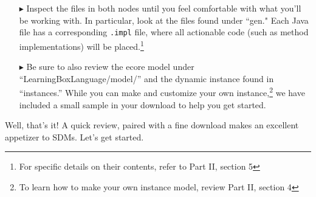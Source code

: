 \begin{itemize}

\item[$\blacktriangleright$] Inspect the files in both nodes until you feel comfortable with what you'll be working with. In particular, look at the files found
under ``gen." Each Java file has a corresponding \texttt{.impl} file, where all actionable code (such as method implementations) will be placed.\footnote{For
specific details on their contents, refer to Part II, section 5} 

\item[$\blacktriangleright$] Be sure to also review the ecore model under ``LearningBoxLanguage/model/'' and the dynamic instance found in ``instances.'' While
you can make and customize your own instance,\footnote{To learn how to make your own instance model, review Part II, section 4} we have included a small sample
in your download to help you get started.

\end{itemize}

Well, that's it! A quick review, paired with a fine download makes an excellent appetizer to SDMs. Let's get started.